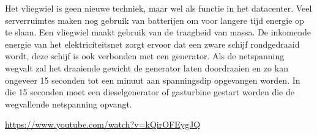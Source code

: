 Het vliegwiel is geen nieuwe techniek, maar wel als functie in het datacenter. Veel serverruimtes maken nog gebruik van batterijen om voor langere tijd energie op te slaan. Een vliegwiel maakt gebruik van de traagheid van massa. De inkomende energie van het elektriciteitsnet zorgt ervoor dat een zware schijf rondgedraaid wordt, deze schijf is ook verbonden met een generator. Als de netspanning wegvalt zal het draaiende gewicht de generator laten doordraaien en zo kan ongeveer 15 seconden tot een minuut aan spanningsdip opgevangen worden. In die 15 seconden moet een dieselgenerator of gasturbine gestart worden die de wegvallende netspanning opvangt.

\url{https://www.youtube.com/watch?v=kQirOFEygJQ}
